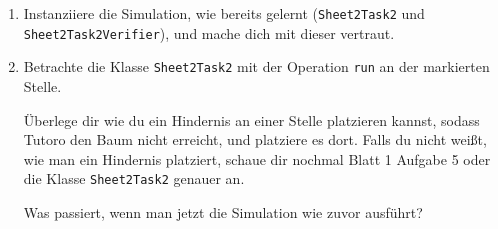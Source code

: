 

\begin{enumerate}
    \item Instanziiere die Simulation, wie bereits gelernt (\lstinline{Sheet2Task2} und \lstinline{Sheet2Task2Verifier}), und mache dich mit dieser vertraut.
    \item Betrachte die Klasse \lstinline{Sheet2Task2} mit der Operation \lstinline{run} an der markierten Stelle.

        Überlege dir wie du ein Hindernis an einer Stelle platzieren kannst, sodass Tutoro den Baum nicht erreicht, und platziere es dort. Falls du nicht weißt, wie man ein Hindernis platziert, schaue dir nochmal Blatt 1 Aufgabe 5 oder die Klasse \lstinline{Sheet2Task2} genauer an.

        Was passiert, wenn man jetzt die Simulation wie zuvor ausführt?\\
        
\end{enumerate}

